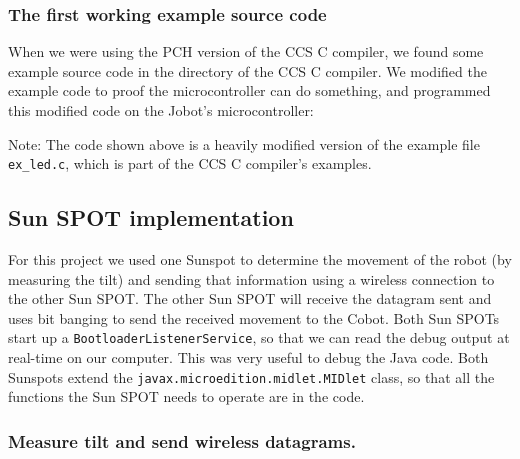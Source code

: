 \documentclass[a4paper,10pt]{article} %
\begin{document}
\subsubsection{The first working example source code} %
\label{ssub:The first working example source code}

When we were using the PCH version of the CCS C compiler, we found some example
source code in the directory of the CCS C compiler. We modified the example code
to proof the microcontroller can do something, and programmed this modified code
on the Jobot's microcontroller:



\noindent Note: The code shown above is a heavily modified version of the
example file \texttt{ex\_led.c}, which is part of the CCS C compiler's examples.



\subsection{Sun SPOT implementation} %
\label{sub:Sun SPOT implementation}

For this project we used one Sunspot to determine the movement of the robot (by
measuring the tilt) and sending that information using a wireless connection to
the other Sun SPOT. The other Sun SPOT will receive the datagram sent and uses
bit banging to send the received movement to the Cobot. Both Sun SPOTs start up
a \texttt{BootloaderListenerService}, so that we can read the debug output at
real-time on our computer. This was very useful to debug the Java code. Both
Sunspots extend the \texttt{javax.microedition.midlet.MIDlet} class, so that all
the functions the Sun SPOT needs to operate are in the code.

\subsubsection{Measure tilt and send wireless datagrams.} %
\end{document}
